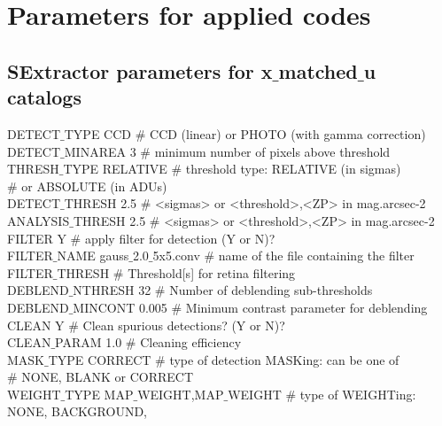 \newpage
{}
\appendix

\chapter{Parameters for applied codes}\label{AP_01}

\section{SExtractor parameters for x$\_$matched$\_$u catalogs}
\label{sec:sex}

\begin{tt}
DETECT$\_$TYPE      CCD            $\#$ CCD (linear) or PHOTO (with gamma correction)\\
DETECT$\_$MINAREA   3              $\#$ minimum number of pixels above threshold\\
THRESH$\_$TYPE      RELATIVE       $\#$ threshold type: RELATIVE (in sigmas)\\
                                $\#$ or ABSOLUTE (in ADUs)\\
DETECT$\_$THRESH    2.5            $\#$ <sigmas> or <threshold>,<ZP> in mag.arcsec-2\\
ANALYSIS$\_$THRESH  2.5            $\#$ <sigmas> or <threshold>,<ZP> in mag.arcsec-2\\
FILTER           Y              $\#$ apply filter for detection (Y or N)?\\
FILTER$\_$NAME      gauss$\_$2.0$\_$5x5.conv   $\#$ name of the file containing the filter\\
FILTER$\_$THRESH                   $\#$ Threshold[s] for retina filtering\\
DEBLEND$\_$NTHRESH  32             $\#$ Number of deblending sub-thresholds\\
DEBLEND$\_$MINCONT  0.005          $\#$ Minimum contrast parameter for deblending\\
CLEAN            Y              $\#$ Clean spurious detections? (Y or N)?\\
CLEAN$\_$PARAM      1.0            $\#$ Cleaning efficiency\\
MASK$\_$TYPE        CORRECT        $\#$ type of detection MASKing: can be one of\\
                                $\#$ NONE, BLANK or CORRECT\\
WEIGHT$\_$TYPE      MAP$\_$WEIGHT,MAP$\_$WEIGHT           $\#$ type of WEIGHTing: NONE, BACKGROUND,\\

\end{tt}
